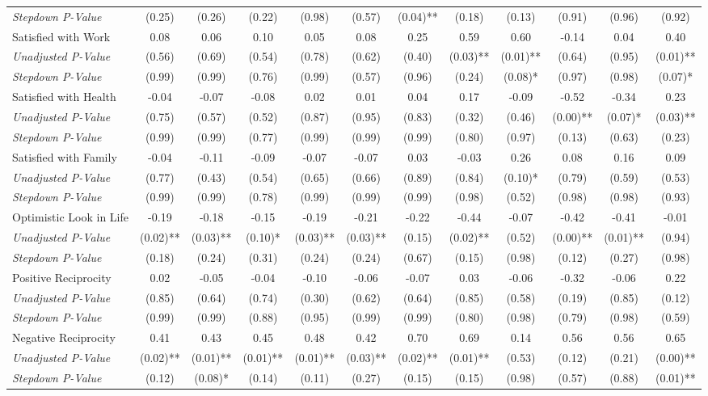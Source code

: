 \begin{tabular}{l c c c c c c c c c c c}
\quad \textit{Stepdown P-Value} & (0.25) & (0.26) & (0.22) & (0.98) & (0.57) & (0.04)** & (0.18) & (0.13) & (0.91) & (0.96) & (0.92) \\
Satisfied with Work & 0.08 & 0.06 & 0.10 & 0.05 & 0.08 & 0.25 & 0.59 & 0.60 & -0.14 & 0.04 & 0.40 \\
\quad \textit{Unadjusted P-Value} & (0.56) & (0.69) & (0.54) & (0.78) & (0.62) & (0.40) & (0.03)** & (0.01)** & (0.64) & (0.95) & (0.01)** \\
\quad \textit{Stepdown P-Value} & (0.99) & (0.99) & (0.76) & (0.99) & (0.57) & (0.96) & (0.24) & (0.08)* & (0.97) & (0.98) & (0.07)* \\
Satisfied with Health & -0.04 & -0.07 & -0.08 & 0.02 & 0.01 & 0.04 & 0.17 & -0.09 & -0.52 & -0.34 & 0.23 \\
\quad \textit{Unadjusted P-Value} & (0.75) & (0.57) & (0.52) & (0.87) & (0.95) & (0.83) & (0.32) & (0.46) & (0.00)** & (0.07)* & (0.03)** \\
\quad \textit{Stepdown P-Value} & (0.99) & (0.99) & (0.77) & (0.99) & (0.99) & (0.99) & (0.80) & (0.97) & (0.13) & (0.63) & (0.23) \\
Satisfied with Family & -0.04 & -0.11 & -0.09 & -0.07 & -0.07 & 0.03 & -0.03 & 0.26 & 0.08 & 0.16 & 0.09 \\
\quad \textit{Unadjusted P-Value} & (0.77) & (0.43) & (0.54) & (0.65) & (0.66) & (0.89) & (0.84) & (0.10)* & (0.79) & (0.59) & (0.53) \\
\quad \textit{Stepdown P-Value} & (0.99) & (0.99) & (0.78) & (0.99) & (0.99) & (0.99) & (0.98) & (0.52) & (0.98) & (0.98) & (0.93) \\
Optimistic Look in Life & -0.19 & -0.18 & -0.15 & -0.19 & -0.21 & -0.22 & -0.44 & -0.07 & -0.42 & -0.41 & -0.01 \\
\quad \textit{Unadjusted P-Value} & (0.02)** & (0.03)** & (0.10)* & (0.03)** & (0.03)** & (0.15) & (0.02)** & (0.52) & (0.00)** & (0.01)** & (0.94) \\
\quad \textit{Stepdown P-Value} & (0.18) & (0.24) & (0.31) & (0.24) & (0.24) & (0.67) & (0.15) & (0.98) & (0.12) & (0.27) & (0.98) \\
Positive Reciprocity & 0.02 & -0.05 & -0.04 & -0.10 & -0.06 & -0.07 & 0.03 & -0.06 & -0.32 & -0.06 & 0.22 \\
\quad \textit{Unadjusted P-Value} & (0.85) & (0.64) & (0.74) & (0.30) & (0.62) & (0.64) & (0.85) & (0.58) & (0.19) & (0.85) & (0.12) \\
\quad \textit{Stepdown P-Value} & (0.99) & (0.99) & (0.88) & (0.95) & (0.99) & (0.99) & (0.80) & (0.98) & (0.79) & (0.98) & (0.59) \\
Negative Reciprocity & 0.41 & 0.43 & 0.45 & 0.48 & 0.42 & 0.70 & 0.69 & 0.14 & 0.56 & 0.56 & 0.65 \\
\quad \textit{Unadjusted P-Value} & (0.02)** & (0.01)** & (0.01)** & (0.01)** & (0.03)** & (0.02)** & (0.01)** & (0.53) & (0.12) & (0.21) & (0.00)** \\
\quad \textit{Stepdown P-Value} & (0.12) & (0.08)* & (0.14) & (0.11) & (0.27) & (0.15) & (0.15) & (0.98) & (0.57) & (0.88) & (0.01)** \\
\bottomrule
\end{tabular}
